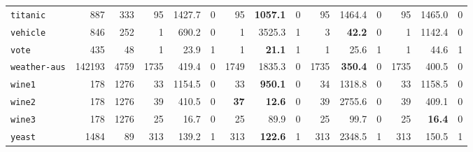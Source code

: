 \begin{tabular}{lccrrrrrrrrrrrr}
\texttt{titanic} & \multicolumn{1}{r}{887} & \multicolumn{1}{r}{333}  & 95 & 1427.7 & 0 & 95 & \textbf{1057.1} & 0 & 95 & 1464.4 & 0 & 95 & 1465.0 & 0\\
\texttt{vehicle} & \multicolumn{1}{r}{846} & \multicolumn{1}{r}{252}  & 1 & 690.2 & 0 & 1 & 3525.3 & 1 & 3 & \textbf{42.2} & 0 & 1 & 1142.4 & 0\\
\texttt{vote} & \multicolumn{1}{r}{435} & \multicolumn{1}{r}{48}  & 1 & 23.9 & 1 & 1 & \textbf{21.1} & 1 & 1 & 25.6 & 1 & 1 & 44.6 & 1\\
\texttt{weather-aus} & \multicolumn{1}{r}{142193} & \multicolumn{1}{r}{4759}  & 1735 & 419.4 & 0 & 1749 & 1835.3 & 0 & 1735 & \textbf{350.4} & 0 & 1735 & 400.5 & 0\\
\texttt{wine1} & \multicolumn{1}{r}{178} & \multicolumn{1}{r}{1276}  & 33 & 1154.5 & 0 & 33 & \textbf{950.1} & 0 & 34 & 1318.8 & 0 & 33 & 1158.5 & 0\\
\texttt{wine2} & \multicolumn{1}{r}{178} & \multicolumn{1}{r}{1276}  & 39 & 410.5 & 0 & \textbf{37} & \textbf{12.6} & 0 & 39 & 2755.6 & 0 & 39 & 409.1 & 0\\
\texttt{wine3} & \multicolumn{1}{r}{178} & \multicolumn{1}{r}{1276}  & 25 & 16.7 & 0 & 25 & 89.9 & 0 & 25 & 99.7 & 0 & 25 & \textbf{16.4} & 0\\
\texttt{yeast} & \multicolumn{1}{r}{1484} & \multicolumn{1}{r}{89}  & 313 & 139.2 & 1 & 313 & \textbf{122.6} & 1 & 313 & 2348.5 & 1 & 313 & 150.5 & 1\\
\bottomrule
\end{tabular}
